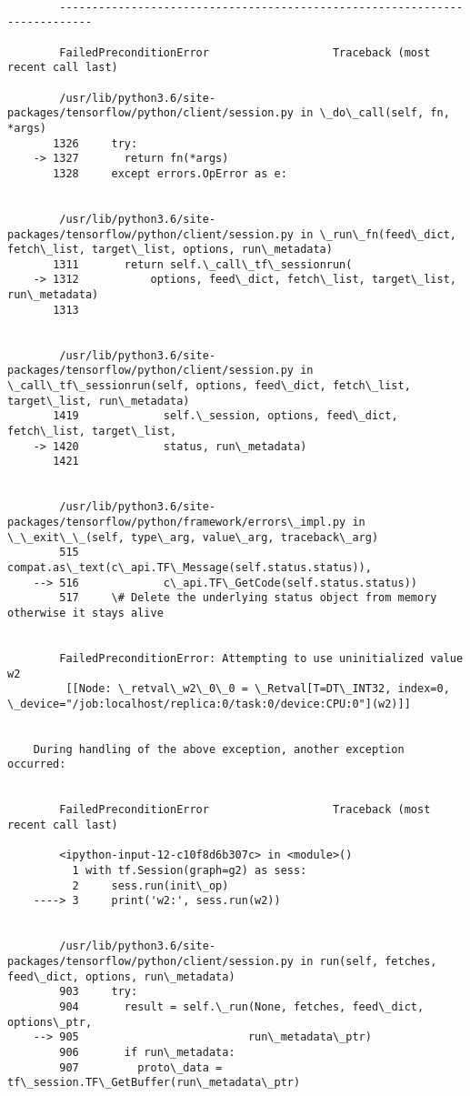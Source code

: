 \documentclass[11pt]{article}
\begin{document}
    \begin{Verbatim}[commandchars=\\\{\}]

        ---------------------------------------------------------------------------

        FailedPreconditionError                   Traceback (most recent call last)

        /usr/lib/python3.6/site-packages/tensorflow/python/client/session.py in \_do\_call(self, fn, *args)
       1326     try:
    -> 1327       return fn(*args)
       1328     except errors.OpError as e:


        /usr/lib/python3.6/site-packages/tensorflow/python/client/session.py in \_run\_fn(feed\_dict, fetch\_list, target\_list, options, run\_metadata)
       1311       return self.\_call\_tf\_sessionrun(
    -> 1312           options, feed\_dict, fetch\_list, target\_list, run\_metadata)
       1313 


        /usr/lib/python3.6/site-packages/tensorflow/python/client/session.py in \_call\_tf\_sessionrun(self, options, feed\_dict, fetch\_list, target\_list, run\_metadata)
       1419             self.\_session, options, feed\_dict, fetch\_list, target\_list,
    -> 1420             status, run\_metadata)
       1421 


        /usr/lib/python3.6/site-packages/tensorflow/python/framework/errors\_impl.py in \_\_exit\_\_(self, type\_arg, value\_arg, traceback\_arg)
        515             compat.as\_text(c\_api.TF\_Message(self.status.status)),
    --> 516             c\_api.TF\_GetCode(self.status.status))
        517     \# Delete the underlying status object from memory otherwise it stays alive


        FailedPreconditionError: Attempting to use uninitialized value w2
    	 [[Node: \_retval\_w2\_0\_0 = \_Retval[T=DT\_INT32, index=0, \_device="/job:localhost/replica:0/task:0/device:CPU:0"](w2)]]

        
    During handling of the above exception, another exception occurred:


        FailedPreconditionError                   Traceback (most recent call last)

        <ipython-input-12-c10f8d6b307c> in <module>()
          1 with tf.Session(graph=g2) as sess:
          2     sess.run(init\_op)
    ----> 3     print('w2:', sess.run(w2))
    

        /usr/lib/python3.6/site-packages/tensorflow/python/client/session.py in run(self, fetches, feed\_dict, options, run\_metadata)
        903     try:
        904       result = self.\_run(None, fetches, feed\_dict, options\_ptr,
    --> 905                          run\_metadata\_ptr)
        906       if run\_metadata:
        907         proto\_data = tf\_session.TF\_GetBuffer(run\_metadata\_ptr)



\end{Verbatim}
\end{document}
